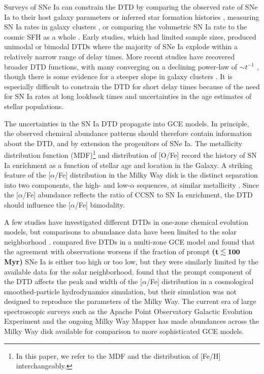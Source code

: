 \documentclass[twocolumn,twocolappendix,linenumbers]{aastex631}
\newcommand{\aFe}{[$\alpha$/Fe]\xspace}
\begin{document}
Surveys of SNe Ia can constrain the DTD by comparing the observed rate of SNe Ia to their host galaxy parameters \citep[e.g.,][]{Mannucci2005-SNRate,Heringer2019-FieldGalaxyDTD} or inferred star formation histories \citep[SFHs; e.g.,][]{Maoz2012-SloanIIDTD}, measuring SN Ia rates in galaxy clusters \citep[e.g.,][]{Maoz2010-ClusterDTD}, or comparing the volumetric SN Ia rate to the cosmic SFH as a whole \citep[e.g.,][]{Graur2014-VolumetricSNIaRates,Strolger2020-ExponentialDTD}. Early studies, which had limited sample sizes, produced unimodal \citep{Strolger2004-SNIaProgenitors} or bimodal \citep{Mannucci2006-TwoPopulations} DTDs where the majority of SNe Ia explode within a relatively narrow range of delay times. More recent studies have recovered broader DTD functions, with many converging on a declining power-law of $\sim t^{-1}$ \citep[e.g.,][]{Maoz2017-CosmicDTD,Castrillo2021-DTD,Wiseman2021-DESRates}, though there is some evidence for a steeper slope in galaxy clusters \citep{Maoz2017-CosmicDTD,FriedmannMaoz2018-ClusterDTD}. It is especially difficult to constrain the DTD for short delay times \citep{MaozMannucci2012-SNeIaReview} because of the need for SN Ia rates at long lookback times and uncertainties in the age estimates of stellar populations.

The uncertainties in the SN Ia DTD propagate into GCE models. In principle, the observed chemical abundance patterns should therefore contain information about the DTD, and by extension the progenitors of SNe Ia. The metallicity distribution function (MDF)\footnote{In this paper, we refer to the MDF and the distribution of [Fe/H] interchangeably.} and distribution of [O/Fe] record the history of SN Ia enrichment as a function of stellar age and location in the Galaxy. A striking feature of the \aFe distribution in the Milky Way disk is the distinct separation into two components, the high- and low-$\alpha$ sequences, at similar metallicity \citep[e.g.,][]{Bensby2014-solarNeighborhoodAbundances}. Since the \aFe abundance reflects the ratio of CCSN to SN Ia enrichment, the DTD should influence the \aFe bimodality.

A few studies have investigated different DTDs in one-zone chemical evolution models, but comparisons to abundance data have been limited to the solar neighborhood \citep[e.g.,][]{Andrews2017-ChemicalEvolution,Palicio2023-AnalyticDTD}. \citet{Matteucci2009-DTDModels} compared five DTDs in a multi-zone GCE model and found that the agreement with observations worsens if the fraction of prompt {\bf ($\bf t\lesssim 100$ Myr)} SNe Ia is either too high or too low, but they were similarly limited by the available data for the solar neighborhood. \citet{Poulhazan2018-PrecisionPollution} found that the prompt component of the DTD affects the peak and width of the \aFe distribution in a cosmological smoothed-particle hydrodynamics simulation, but their simulation was not designed to reproduce the parameters of the Milky Way. The current era of large spectroscopic surveys such as the Apache Point Observatory Galactic Evolution Experiment \citep[APOGEE;][]{Majewski2017-APOGEE} and the ongoing Milky Way Mapper \citep{Kollmeier2017-SDSS-V} has made abundances across the Milky Way disk available for comparison to more sophisticated GCE models.
\end{document}
